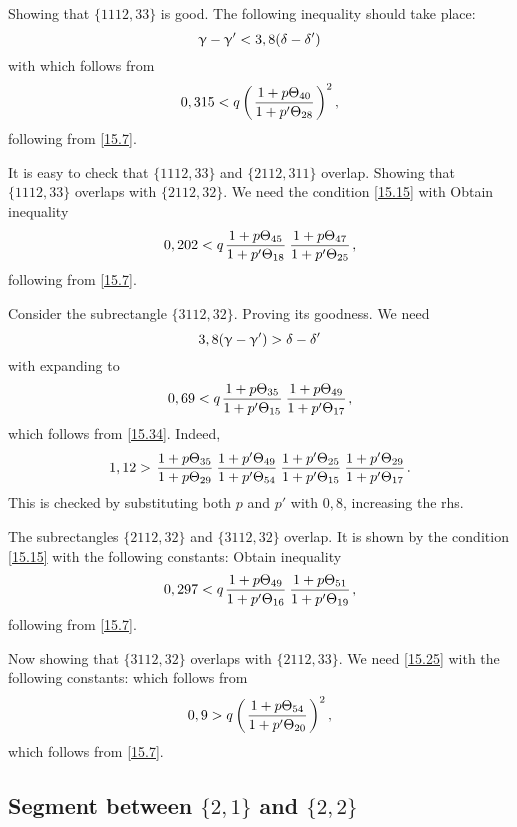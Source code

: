 Showing that $\{1112, 33\}$ is good.
The following inequality should take place:
\begin{equation*}
	\upgamma - \upgamma' < 3,8 (\delta - \delta')
\end{equation*}
with
which follows from
\begin{equation*}
	0,315 < q \left(\mkern 2mu \dfrac{1 + {p} \Theta_{40}}{1 + {p'} \Theta_{28}} \mkern 2mu\right)^2,
\end{equation*}
following from \ref{15.7}.

It is easy to check that $\{1112, 33\}$ and $\{2112, 311\}$ overlap.
Showing that $\{1112, 33\}$ overlaps with $\{2112, 32\}$.
We need the condition \ref{15.15} with
Obtain inequality
\begin{equation*}
	0,202 < q \up{45}{18} \up{47}{25},
\end{equation*}
following from \ref{15.7}.

Consider the subrectangle $\{3112, 32\}$.
Proving its goodness.
We need
\begin{equation*}
	3,8 (\upgamma - \upgamma') > \delta - \delta'
\end{equation*}
with
expanding to
\begin{equation*}
	0,69 < q \up{35}{15} \up{49}{17},
\end{equation*}
which follows from \ref{15.34}.
Indeed,
\begin{equation*}
	1,12 > \uu{35}{29} \pp{49}{54} \pp{25}{15} \pp{29}{17}.
\end{equation*}
This is checked by substituting both $p$ and $p'$ with $0,8$, increasing the rhs.

The subrectangles $\{2112, 32\}$ and $\{3112, 32\}$ overlap.
It is shown by the condition \ref{15.15} with the following constants:
Obtain inequality
\begin{equation*}
	0,297 < q \up{49}{16} \up{51}{19},
\end{equation*}
following from \ref{15.7}.

Now showing that $\{3112, 32\}$ overlaps with $\{2112, 33\}$.
We need \ref{15.25} with the following constants:
which follows from
\begin{equation*}
	0,9 > q \left(\mkern 2mu \dfrac{1 + {p} \Theta_{54}}{1 + {p'} \Theta_{20}} \mkern 2mu\right)^2,
\end{equation*}
which follows from \ref{15.7}.

\subsection{Segment between $\{2, 1\}$ and $\{2, 2\}$}

